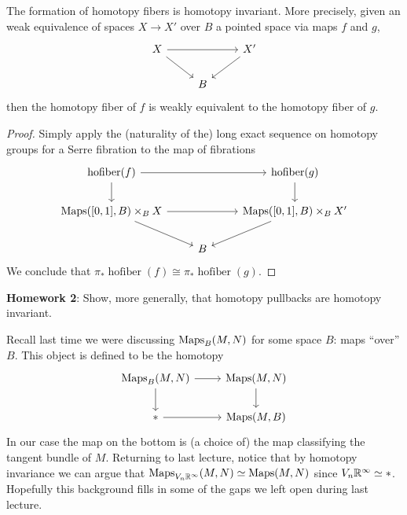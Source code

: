 \documentclass{amsart}
\DeclareMathOperator{\hofiber}{hofiber}
\begin{document}
\begin{lemma}
    The formation of homotopy fibers is homotopy invariant. More precisely, given an weak
    equivalence of spaces $X\to X'$ over $B$ a pointed space via maps $f$ and $g$,
    \begin{equation*}
        \begin{tikzcd}
            X \ar[rr]\ar[rd]{f} &  & X'\ar[ld]{g} \\
            & B &
        \end{tikzcd}
    \end{equation*}
    then the homotopy fiber of $f$ is weakly equivalent to the homotopy fiber of $g$.
\end{lemma}
\begin{proof}
    Simply apply the (naturality of the) long exact sequence on homotopy groups for a
    Serre fibration to the map of fibrations 
    \begin{equation*}
        \begin{tikzcd}
            \hofiber(f)\dar \ar[rr] & \; & \hofiber(g)\dar \\
            \Maps([0,1],B)\times_B X \ar[rr]\drar & \; & \Maps([0,1],B)\times_B X'\ar[dl] \\
            \; & B & 
        \end{tikzcd}
    \end{equation*}
    We conclude that $\pi_*\hofiber(f)\cong\pi_*\hofiber(g)$.
\end{proof}

\textbf{Homework 2}: Show, more generally, that homotopy pullbacks are homotopy invariant.

Recall last time we were discussing $\operatorname{Maps}_B(M,N)$ for some space $B$: maps ``over'' $B$.
This object is defined to be the homotopy
\begin{equation*}
    \begin{tikzcd}
        \Maps_B(M,N) \rar\dar & \Maps(M,N) \dar \\
        * \rar & \Maps(M,B)
    \end{tikzcd}
\end{equation*}
In our case the map on the bottom is (a choice of) the map classifying the tangent bundle of $M$.
Returning to last lecture, notice that by homotopy invariance we can argue that
$\operatorname{Maps}_{V_n\mathbb{R}^\infty}(M,N)\simeq \operatorname{Maps}(M,N)$ since $V_n\mathbb{R}^\infty\simeq*$.
Hopefully this background fills in some of the gaps we left open during last lecture.
\end{document}
